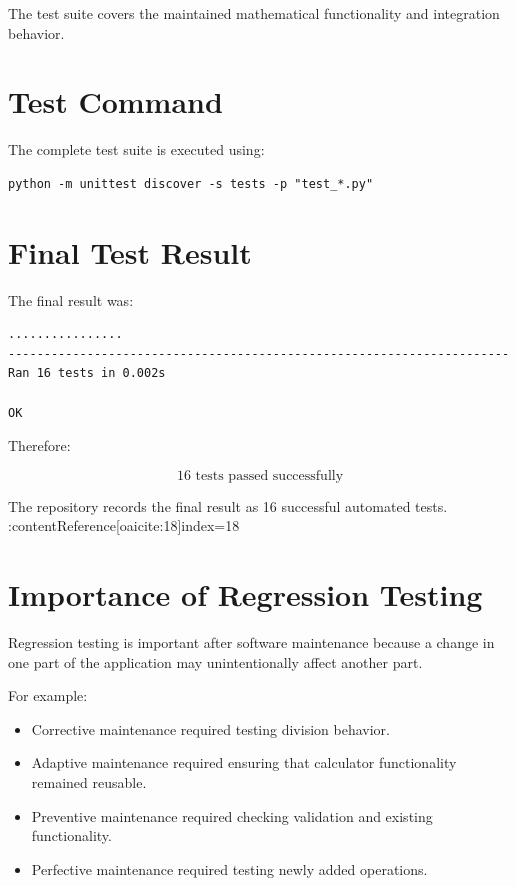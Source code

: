 \documentclass[12pt,a4paper]{report}
\begin{document}
The test suite covers the maintained mathematical functionality and
integration behavior.

\section{Test Command}

The complete test suite is executed using:

\begin{lstlisting}
python -m unittest discover -s tests -p "test_*.py"
\end{lstlisting}

\section{Final Test Result}

The final result was:

\begin{lstlisting}
................
----------------------------------------------------------------------
Ran 16 tests in 0.002s

OK
\end{lstlisting}

Therefore:

\[
\boxed{16\text{ tests passed successfully}}
\]

The repository records the final result as 16 successful automated
tests. :contentReference[oaicite:18]{index=18}

\section{Importance of Regression Testing}

Regression testing is important after software maintenance because a
change in one part of the application may unintentionally affect
another part.

For example:

\begin{itemize}
    \item Corrective maintenance required testing division behavior.
    \item Adaptive maintenance required ensuring that calculator
    functionality remained reusable.
    \item Preventive maintenance required checking validation and
    existing functionality.
    \item Perfective maintenance required testing newly added
    operations.
\end{itemize}
\end{document}
